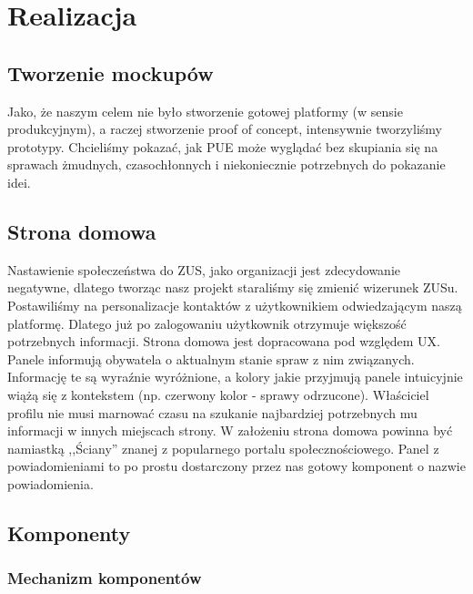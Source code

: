 \documentclass[licencjacka]{pracamgr}
\begin{document}
\chapter{Realizacja}

\section{Tworzenie mockupów}
Jako, że naszym celem nie było stworzenie gotowej platformy (w sensie produkcyjnym), a raczej stworzenie proof of concept,
intensywnie tworzyliśmy prototypy. Chcieliśmy pokazać, jak PUE może wyglądać bez skupiania się na
sprawach żmudnych, czasochłonnych i niekoniecznie potrzebnych do pokazanie idei.

\section{Strona domowa}
Nastawienie społeczeństwa do ZUS, jako organizacji jest zdecydowanie negatywne, dlatego tworząc nasz projekt staraliśmy się
zmienić wizerunek ZUSu. Postawiliśmy na personalizacje kontaktów z użytkownikiem odwiedzającym naszą platformę. Dlatego już po zalogowaniu
użytkownik otrzymuje większość potrzebnych informacji. Strona domowa jest dopracowana pod względem UX. Panele informują
obywatela o aktualnym stanie spraw z nim związanych. Informację te są wyraźnie wyróżnione, a kolory jakie przyjmują panele
intuicyjnie wiążą się z kontekstem (np. czerwony kolor - sprawy odrzucone). Właściciel profilu nie musi marnować czasu
na szukanie najbardziej potrzebnych mu informacji w innych miejscach strony. W założeniu strona domowa powinna być
namiastką ,,Ściany'' znanej z popularnego portalu społecznościowego. Panel z powiadomieniami to po prostu dostarczony
przez nas gotowy komponent o nazwie powiadomienia.

\section{Komponenty}
\subsection{Mechanizm komponentów}
\end{document}

